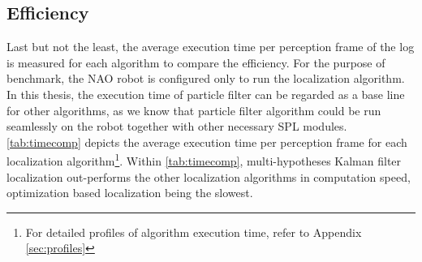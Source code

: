 \subsection{Efficiency}
\label{sub:Efficiency}
Last but not the least, the average execution time per perception frame of the log is measured for each algorithm to compare the efficiency. For the purpose of benchmark, the NAO robot is configured only to run the localization algorithm. In this thesis, the execution time of particle filter can be regarded as a base line for other algorithms, as we know that particle filter algorithm could be run seamlessly on the robot together with other necessary \gls{SPL} modules. \autoref{tab:timecomp} depicts the average execution time per perception frame for each localization algorithm\footnote{For detailed profiles of algorithm execution time, refer to Appendix \ref{sec:profiles}}. Within \autoref{tab:timecomp}, multi-hypotheses Kalman filter localization out-performs the other localization algorithms in computation speed, optimization based localization being the slowest.




